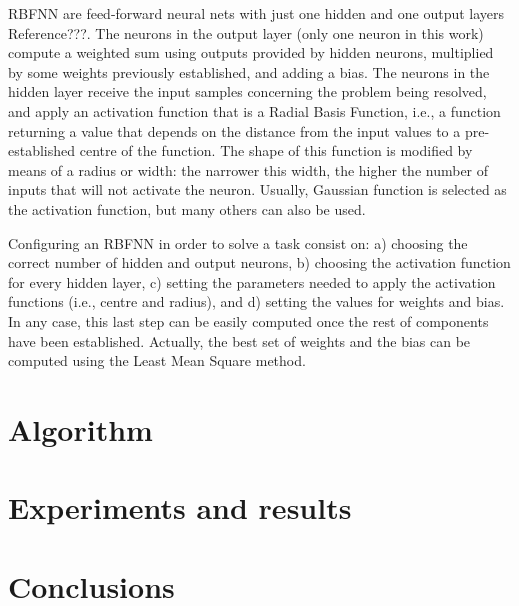 \documentclass{llncs}
\begin{document}
RBFNN are feed-forward neural nets with just one hidden and one output layers Reference???. The neurons in the output layer (only one neuron in this work) compute a weighted sum using outputs provided by hidden neurons, multiplied by some weights previously established, and adding a bias. The neurons in the hidden layer receive the input samples concerning the problem being resolved, and apply an activation function that  is a Radial Basis Function, i.e., a function returning a value that depends on the distance from the input values to a pre-established centre of the function. The shape of this function is modified by means of a radius or width: the narrower this width, the higher the number of inputs that will not activate the neuron. Usually, Gaussian function is selected as the activation function, but many others can also be used.

Configuring an RBFNN in order to solve a task consist on: a) choosing the correct number of hidden and output neurons, b) choosing the activation function for every hidden layer, c) setting the parameters needed to apply the activation functions (i.e., centre and radius), and d) setting the values for weights and bias. In any case, this last step can be easily computed once the rest of components have been established. Actually, the best set of weights and the bias can be computed using the Least Mean Square method. 

\section{Algorithm}
\label{sec:algorithm}
\section{Experiments and results}
\section{Conclusions}
%
%
\begin{thebibliography}{}
%


\end{thebibliography}
%
\end{document}
